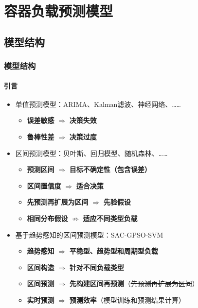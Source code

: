 \section{容器负载预测模型}

\subsection{模型结构}

\begin{frame}
\frametitle{模型结构}
\framesubtitle{引言}
\begin{itemize}
    \item 单值预测模型：ARIMA、Kalman滤波、神经网络、……
    \begin{itemize}
        \item \textbf{误差敏感} $\Rightarrow$ \textbf{决策失效}
        \item \textbf{鲁棒性差} $\Rightarrow$ \textbf{决策过度}
    \end{itemize}
    \item 区间预测模型：贝叶斯、回归模型、随机森林、……
    \begin{itemize}
        \item \textbf{预测区间} $\Rightarrow$ \textbf{目标不确定性（包含误差）}
        \item \textbf{区间置信度} $\Rightarrow$ \textbf{适合决策}
        \item \alert{\textbf{先预测再扩展为区间} $\Rightarrow$ \textbf{先验假设}}
        \item \alert{\textbf{相同分布假设} $\nRightarrow$ \textbf{适应不同类型负载}}
    \end{itemize}
    \item 基于趋势感知的区间预测模型：SAC-GPSO-SVM
    \begin{itemize}
        \item \textbf{趋势感知} $\Rightarrow$ \textbf{平稳型、趋势型和周期型负载}
        \item \textbf{区间构造} $\Rightarrow$ \textbf{针对不同负载类型}
        \item \textbf{区间预测} $\Rightarrow$ \textbf{先构建区间再预测}（\sout{先预测再扩展为区间}）
        \item \textbf{实时预测} $\Rightarrow$ \textbf{预测效率}（模型训练和预测结果计算）
    \end{itemize}
\end{itemize}
\end{frame}

